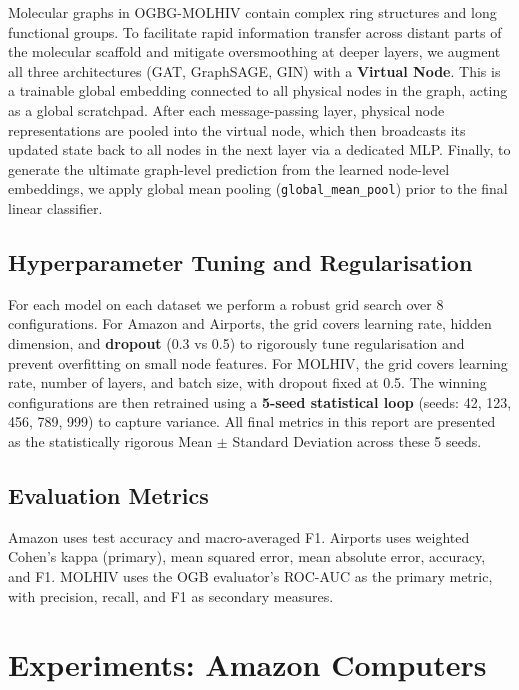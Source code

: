 \documentclass[conference]{IEEEtran}
\begin{document}
Molecular graphs in OGBG-MOLHIV contain complex ring structures and long functional groups. To facilitate rapid information transfer across distant parts of the molecular scaffold and mitigate oversmoothing at deeper layers, we augment all three architectures (GAT, GraphSAGE, GIN) with a \textbf{Virtual Node}. This is a trainable global embedding connected to all physical nodes in the graph, acting as a global scratchpad. After each message-passing layer, physical node representations are pooled into the virtual node, which then broadcasts its updated state back to all nodes in the next layer via a dedicated MLP. Finally, to generate the ultimate graph-level prediction from the learned node-level embeddings, we apply global mean pooling (\texttt{global\_mean\_pool}) prior to the final linear classifier.

\subsection{Hyperparameter Tuning and Regularisation}

For each model on each dataset we perform a robust grid search over 8 configurations. For Amazon and Airports, the grid covers learning rate, hidden dimension, and \textbf{dropout} (0.3 vs 0.5) to rigorously tune regularisation and prevent overfitting on small node features. For MOLHIV, the grid covers learning rate, number of layers, and batch size, with dropout fixed at 0.5. The winning configurations are then retrained using a \textbf{5-seed statistical loop} (seeds: 42, 123, 456, 789, 999) to capture variance. All final metrics in this report are presented as the statistically rigorous Mean $\pm$ Standard Deviation across these 5 seeds.

\subsection{Evaluation Metrics}

Amazon uses test accuracy and macro-averaged F1. Airports uses weighted Cohen's kappa (primary), mean squared error, mean absolute error, accuracy, and F1. MOLHIV uses the OGB evaluator's ROC-AUC as the primary metric, with precision, recall, and F1 as secondary measures.

\section{Experiments: Amazon Computers}
\end{document}
